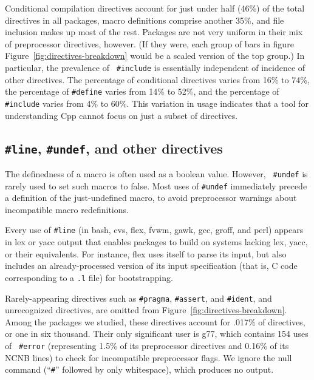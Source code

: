 \documentclass[10pt]{article}
\newcommand{\pkg}[1]{\textsf{#1}}
\begin{document}
Conditional compilation directives account for just under half (46\%) of
the total directives in all packages, macro definitions comprise another
35\%, and file inclusion makes up most of the rest.  Packages are not very
uniform in their mix of preprocessor directives, however.  (If they were,
each group of bars in figure Figure~\ref{fig:directives-breakdown} would be
a scaled version of the top group.)  In particular, the prevalence of {\tt
\#include} is essentially independent of incidence of other directives.
The percentage of conditional directives varies from 16\% to 74\%, the
percentage of {\tt \#define} varies from 14\% to 52\%, and the percentage
of {\tt \#include} varies from 4\% to 60\%.  This variation in usage
indicates that a tool for understanding Cpp cannot focus on just a subset
of directives.  


\subsection{{\tt \#line}, {\tt \#undef}, and other directives}

The definedness of a macro is often used as a boolean value.  However, {\tt
\#undef} is rarely used to set such macros to false.  Most uses of
{\tt \#undef} immediately precede a definition of the just-undefined macro,
to avoid preprocessor warnings about incompatible macro redefinitions.

Every use of {\tt \#line} (in \pkg{bash}, \pkg{cvs}, \pkg{flex}, \pkg{fvwm},
\pkg{gawk}, \pkg{gcc}, \pkg{groff}, and \pkg{perl}) appears in lex or yacc
output that enables packages to build on systems lacking lex, yacc, or
their equivalents.  For instance, \pkg{flex} uses itself to parse its
input, but also includes an already-processed version of its input
specification (that is, C code corresponding to a {\tt .l} file) for
bootstrapping.


Rarely-appearing directives such as {\tt \#pragma}, {\tt \#assert}, and
{\tt \#ident}, and unrecognized directives, are omitted from
Figure~\ref{fig:directives-breakdown}.  Among the packages we studied,
these directives account for .017\% of directives, or one in six thousand.
Their only significant user is \pkg{g77}, which contains 154 uses of {\tt
\#error} (representing 1.5\% of its preprocessor directives and 0.16\% of
its NCNB lines) to check for incompatible preprocessor flags.  We ignore
the null command (``{\tt \#}'' followed by only whitespace), which produces
no output.
\end{document}
